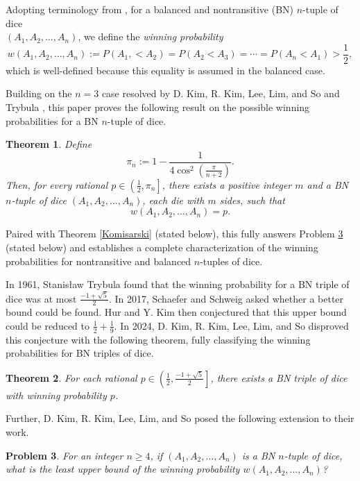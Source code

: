 \documentclass[11pt]{article}
\newtheorem{theorem}{Theorem}[section]
\newtheorem{problem}[theorem]{Problem}
\theoremstyle{definition}
\begin{document}
Adopting terminology from \cite{Kim2025Balanced4Dice}, for a balanced and nontransitive (BN) $n$-tuple of dice \\$(A_1,A_2,\dots,A_n)$, we define the \emph{winning probability}
$$w(A_1,A_2,\dots,A_n) := P(A_1,<A_2) = P(A_2<A_3) = \cdots = P(A_n < A_1) > \frac{1}{2},$$
which is well-defined because this equality is assumed in the balanced case. 

Building on the $n=3$ case resolved by D. Kim, R. Kim, Lee, Lim, and So \cite{KKLLS2024} and Trybula \cite{Trybula61}, this paper proves the following result on the possible winning probabilities for a BN $n$-tuple of dice.
\begin{theorem} \label{mainThm}
    Define
    \begin{equation}\label{Pi_nDef}
        \pi_n := 1-\frac{1}{4\cos^2\left( \frac{\pi}{n+2} \right)}.
    \end{equation}
    Then, for every rational $p \in \left( \frac{1}{2}, \pi_n \right]$, there exists a positive integer $m$ and a BN $n$-tuple of dice $(A_1,A_2,\dots, A_n)$, each die with $m$ sides, such that
    $$w(A_1,A_2,\dots,A_n) = p.$$
\end{theorem}
Paired with Theorem \ref{Komisarski} (stated below), this fully answers Problem \ref{KKLLSProb} (stated below) and establishes a complete characterization of the winning probabilities for nontransitive and balanced $n$-tuples of dice.

In 1961, Stanisław Trybula \cite{Trybula61} found that the winning probability for a BN triple of dice was at most $\frac{-1+\sqrt{5}}{2}$. In 2017, Schaefer and Schweig \cite{SchaeferSchweig2017} asked whether a better bound could be found. Hur and Y. Kim \cite{HurKim} then conjectured that this upper bound could be reduced to $\frac{1}{2} + \frac{1}{9}$. In 2024, D. Kim, R. Kim, Lee, Lim, and So \cite{KKLLS2024} disproved this conjecture with the following theorem, fully classifying the winning probabilities for BN triples of dice.
\begin{theorem}\label{KKLLSThm}
    \cite{KKLLS2024} For each rational $p \in \left( \frac{1}{2}, \frac{-1+\sqrt{5}}{2} \right]$, there exists a BN triple of dice with winning probability $p$.
\end{theorem}
Further, D. Kim, R. Kim, Lee, Lim, and So \cite{KKLLS2024} posed the following extension to their work.
\begin{problem}\label{KKLLSProb}
    \cite{KKLLS2024} For an integer $n \geq 4$, if $(A_1,A_2,\dots,A_n)$ is a BN $n$-tuple of dice, what is the least upper bound of the winning probability $w(A_1,A_2,\dots,A_n)$?
\end{problem}
\end{document}
